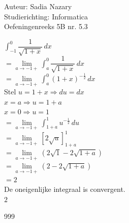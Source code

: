 \documentclass[a4paper]{article}
\begin{document}
\noindent \large Auteur: Sadia Nazary \\
\noindent \large Studierichting: Informatica\\
\noindent \large Oefeningenreeks 5B nr. 5.3\\

\medskip

\normalsize

$\displaystyle \int_{-1}^{0}\dfrac{1}{\sqrt{1+x}}\,dx$\\

$=
\displaystyle \lim\limits_{a\to -1+}
\int_a^0\dfrac{1}{\sqrt{1+x}}\,dx$\\

$=
\displaystyle \lim\limits_{a\to -1+}
\int_a^0(1+x)^{-\tfrac{1}{2}}\,dx$\\

Stel $u=1+x\Rightarrow du=dx$\\

$x=a\Rightarrow u=1+a$\\

$x=0\Rightarrow u=1$\\

$=
\displaystyle \lim\limits_{a\to -1+}
\int_{1+a}^1 u^{-\tfrac{1}{2}}\,du$\\

$=
\displaystyle \lim\limits_{a\to -1+}
\left[
2\sqrt{u}
\right]_{1+a}^1$\\

$=
\displaystyle \lim\limits_{a\to -1+}
\left(
2\sqrt{1}-2\sqrt{1+a}
\right)$\\

$=
\displaystyle \lim\limits_{a\to -1+}
\left(
2-2\sqrt{1+a}
\right)$\\

$=
2$\\

De oneigenlijke integraal is convergent.\\

$\boxed{2}$\\

\begin{thebibliography}{999}
\end{thebibliography}
\end{document}
